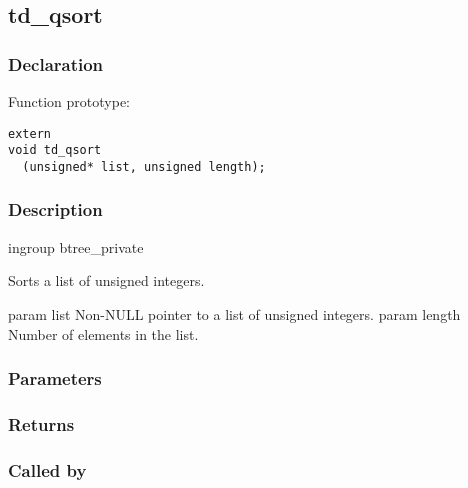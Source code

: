 
\newpage
\subsection{td\_qsort}
\subsubsection{Declaration} Function prototype:

\begin{verbatim}
extern
void td_qsort
  (unsigned* list, unsigned length);
\end{verbatim}

\subsubsection{Description}

 
 ingroup btree\_private 

 Sorts a list of unsigned integers.

 param list Non-NULL pointer to a list of unsigned integers.
 param length Number of elements in the list.
 

\subsubsection{Parameters}
\subsubsection{Returns}
\subsubsection{Called by}
